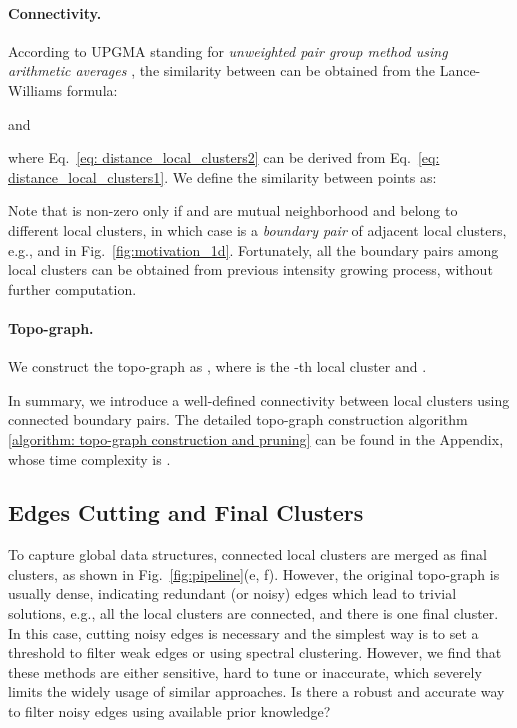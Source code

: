 \documentclass[letterpaper]{article} \usepackage{aaai22}  \usepackage{times}  \usepackage{helvet}  \usepackage{courier}  \usepackage[hyphens]{url}  \usepackage{graphicx} \urlstyle{rm} \def\UrlFont{\rm}  \usepackage{natbib}  \usepackage{caption} \DeclareCaptionStyle{ruled}{labelfont=normalfont,labelsep=colon,strut=off} \frenchspacing  \setlength{\pdfpagewidth}{8.5in}  \setlength{\pdfpageheight}{11in}  \usepackage{subfigure}
\begin{document}
\paragraph{Connectivity.} According to UPGMA standing for \textit{unweighted pair group method using arithmetic averages} \cite{10.5555/46712, gan2020data}, the similarity  between  can be obtained from the Lance-Williams formula:

and 

where Eq.~\ref{eq: distance_local_clusters2} can be derived from Eq.~\ref{eq: distance_local_clusters1}. We define the similarity between points as:

Note that  is non-zero only if  and  are mutual neighborhood and belong to different local clusters, in which case  is a \textit{boundary pair} of adjacent local clusters, e.g.,  and  in Fig.~\ref{fig:motivation_1d}. Fortunately, all the boundary pairs among local clusters can be obtained from previous intensity growing process, without further computation.




\paragraph{Topo-graph.} We construct the topo-graph as , where  is the -th local cluster  and .

\quad

In summary, we introduce a well-defined connectivity between local clusters using connected boundary pairs. The detailed topo-graph construction algorithm \ref{algorithm: topo-graph construction and pruning} can be found in the Appendix, whose time complexity is .

\subsection{Edges Cutting and Final Clusters}
To capture global data structures, connected local clusters are merged as final clusters, as shown in Fig.~\ref{fig:pipeline}(e, f). However, the original topo-graph is usually dense, indicating redundant (or noisy) edges which lead to trivial solutions, e.g., all the local clusters are connected, and there is one final cluster. In this case, cutting noisy edges is necessary and the simplest way is to set a threshold to filter weak edges or using spectral clustering. However, we find that these methods are either sensitive, hard to tune or inaccurate, which severely limits the widely usage of similar approaches. Is there a robust and accurate way to filter noisy edges using available prior knowledge?
\end{document}
